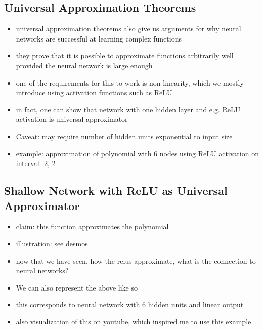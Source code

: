 \documentclass{article}
\begin{document}
\subsection*{Universal Approximation Theorems}
\begin{itemize}
    \item universal approximation theorems also give us arguments for why neural networks are successful at learning complex functions
    \item they prove that it is possible to approximate functions arbitrarily well provided the neural network is large enough
    \item one of the requirements for this to work is non-linearity, which we mostly introduce using activation functions such as ReLU
    \item in fact, one can show that network with one hidden layer and e.g. ReLU activation is universal approximator
    \item Caveat: may require number of hidden units exponential to input size
    \item example: approximation of polynomial with 6 nodes using ReLU activation on interval -2, 2
\end{itemize}
    
\subsection*{Shallow Network with ReLU as Universal Approximator}
\begin{itemize}
    \item claim: this function approximates the polynomial
    \item illustration: see desmos
    \item now that we have seen, how the relus approximate, what is the connection to neural networks?
    \item We can also represent the above like so
    \item this corresponds to neural network with 6 hidden units and linear output
    \item also visualization of this on youtube, which inspired me to use this example
\end{itemize}
\end{document}
